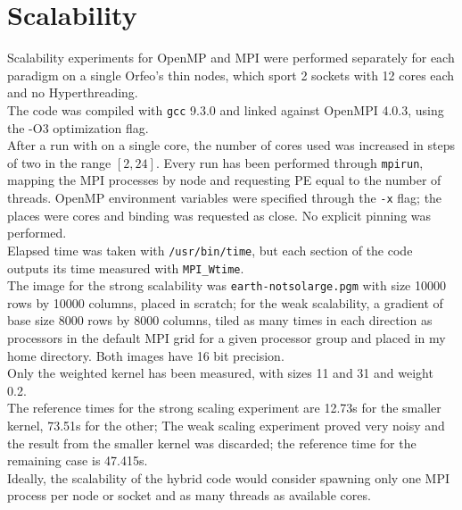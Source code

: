 \documentclass[a4paper, 11pt]{article}
\begin{document}
\section{Scalability}
Scalability experiments for OpenMP and MPI were performed separately for each paradigm on a single Orfeo's thin nodes, which sport 2 sockets with 12 cores each and no Hyperthreading.\\
The code was compiled with \texttt{gcc} 9.3.0 and linked against OpenMPI 4.0.3, using the -O3 optimization flag.\\
After a run with on a single core, the number of cores used was increased in steps of two in the range $[2, 24]$. Every run has been performed through \texttt{mpirun}, mapping the MPI processes by node and requesting PE equal to the number of threads. OpenMP environment variables were specified through the \texttt{-x} flag; the places were cores and binding was requested as close. No explicit pinning was performed.\\
Elapsed time was taken with \texttt{/usr/bin/time}, but each section of the code outputs its time measured with \texttt{MPI\_Wtime}.\\
The image for the strong scalability was \texttt{earth-notsolarge.pgm} with size 10000 rows by 10000 columns, placed in scratch; for the weak scalability, a gradient of base size 8000 rows by 8000 columns, tiled as many times in each direction as processors in the default MPI grid for a given processor group and placed in my home directory. Both images have 16 bit precision.\\
Only the weighted kernel has been measured, with sizes 11 and 31 and weight 0.2.\\
The reference times for the strong scaling experiment are 12.73s for the smaller kernel, 73.51s for the other; The weak scaling experiment proved very noisy and the result from the smaller kernel was discarded; the reference time for the remaining case is  47.415s.\\
Ideally, the scalability of the hybrid code would consider spawning only one MPI process per node or socket and as many threads as available cores.\\
\end{document}
